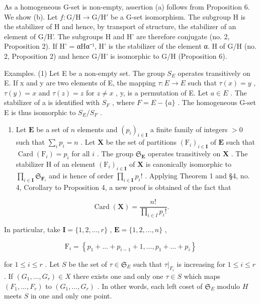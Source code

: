 As a homogeneous G-set is non-empty, assertion (a) follows from Proposition 6. We show (b). Let \(f: \mathrm{G} / \mathrm{H} \to \mathrm{G} / \mathrm{H}'\) be a G-set isomorphism. The subgroup H is the stabilizer of H and hence, by transport of structure, the stabilizer of an element of G/H'. The subgroups H and H' are therefore conjugate (no. 2, Proposition 2). If H' = αHα⁻¹, H' is the stabilizer of the element α. H of G/H (no. 2, Proposition 2) and hence G/H' is isomorphic to G/H (Proposition 6).

Examples. (1) Let E be a non-empty set. The group \(S_{E}\) operates transitively on E. If x and y are two elements of E, the mapping \(\tau: E \to E\) such that \(\tau(x) = y\) , \(\tau(y) = x\) and \(\tau(z) = z\) for \(z \neq x\) , y, is a permutation of E. Let \(a \in E\) . The stabilizer of a is identified with \(S_{F}\) , where \(F = E - \{a\}\) . The homogeneous G-set E is thus isomorphic to \(S_{E}/S_{F}\) .

\begin{enumerate}
\def\labelenumi{(\arabic{enumi})}
\setcounter{enumi}{1}
\tightlist
\item
  Let \(\mathbf{E}\) be a set of \(n\) elements and \((p_i)_{i\in \mathbf{I}}\) a finite family of integers \(>0\) such that \(\sum_{i}p_{i} = n\) . Let \(\mathbf{X}\) be the set of partitions \((\mathrm{F}_i)_{i\in \mathbf{I}}\) of \(\mathbf{E}\) such that \(\operatorname {Card}(\mathrm{F}_i) = p_i\) for all \(i\) . The group \(\mathfrak{S}_{\mathbf{E}}\) operates transitively on \(\mathbf{X}\) . The stabilizer H of an element \((\mathrm{F}_i)_{i\in \mathbf{I}}\) of \(\mathbf{X}\) is canonically isomorphic to \(\prod_{i\in \mathbf{I}}\mathfrak{S}_{\mathbf{F}_i}\) and is hence of order \(\prod_{i\in \mathbf{I}}p_i!\) . Applying Theorem 1 and §4, no. 4, Corollary to Proposition 4, a new proof is obtained of the fact that
\end{enumerate}

\[
\operatorname{Card} (\mathbf {X}) = \frac {n !}{\prod_ {i \in I} p _ {i} !}.
\]

In particular, take \(\mathbf{I} = \{1,2,\dots,r\}\) , \(\mathbf{E} = \{1,2,\dots,n\}\) ,

\[
\mathrm{F} _ {i} = \left\{p _ {1} + \dots + p _ {i - 1} + 1, \dots , p _ {1} + \dots + p _ {i} \right\}
\]

for \(1 \leqslant i \leqslant r\) . Let \(S\) be the set of \(\tau \in \mathfrak{S}_{E}\) such that \(\tau|_{F_i}\) is increasing for \(1 \leqslant i \leqslant r\) . If \((G_1, \ldots, G_r) \in X\) there exists one and only one \(\tau \in S\) which maps \((F_1, \ldots, F_r)\) to \((G_1, \ldots, G_r)\) . In other words, each left coset of \(\mathfrak{S}_{E}\) modulo \(H\) meets \(S\) in one and only one point.

